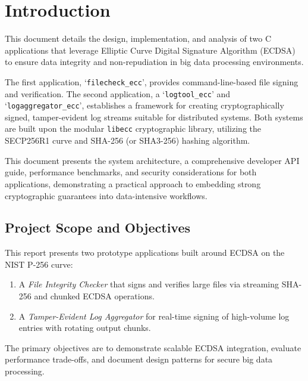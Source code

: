 \chapter{Introduction}
This document details the design, implementation, and analysis of two C applications that leverage Elliptic Curve Digital Signature Algorithm (ECDSA) to ensure data integrity and non-repudiation in big data processing environments.\par
The first application, `\texttt{filecheck\_ecc}', provides command-line-based file signing and verification. The second application, a `\texttt{logtool\_ecc}' and `\texttt{logaggregator\_ecc}', establishes a framework for creating cryptographically signed, tamper-evident log streams suitable for distributed systems. Both systems are built upon the modular \texttt{libecc}\cite{libecc-github} cryptographic library, utilizing the SECP256R1 curve and SHA-256 (or SHA3-256) hashing algorithm.\par
This document presents the system architecture, a comprehensive developer API guide, performance benchmarks, and security considerations for both applications, demonstrating a practical approach to embedding strong cryptographic guarantees into data-intensive workflows.
\section{Project Scope and Objectives}

This report presents two prototype applications built around ECDSA on the NIST P-256 curve:  
\begin{enumerate}
	\item A \emph{File Integrity Checker} that signs and verifies large files via streaming SHA-256 and chunked ECDSA operations.  
	\item A \emph{Tamper-Evident Log Aggregator} for real-time signing of high-volume log entries with rotating output chunks.  
\end{enumerate}
The primary objectives are to demonstrate scalable ECDSA integration, evaluate performance trade-offs, and document design patterns for secure big data processing.

